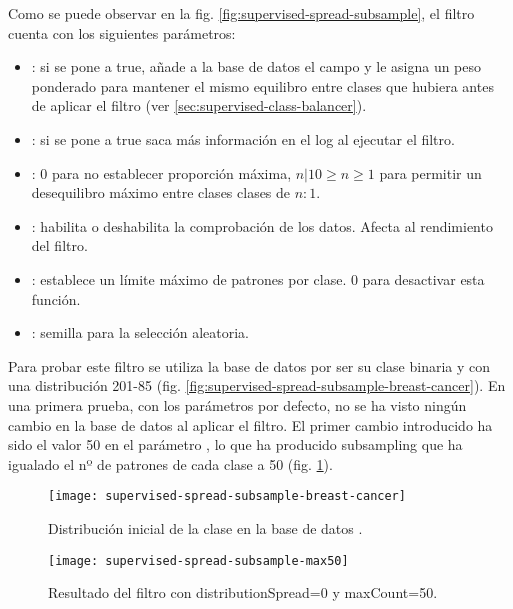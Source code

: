 Como se puede observar en la fig. \ref{fig:supervised-spread-subsample}, el filtro  cuenta con los siguientes parámetros:
\begin{itemize}
    \item {}: si se pone a true, añade a la base de datos el campo  y le asigna un peso ponderado para mantener el mismo equilibro entre clases que hubiera antes de aplicar el filtro (ver \ref{sec:supervised-class-balancer}).
    \item {}: si se pone a true saca más información en el log al ejecutar el filtro.
    \item {}: 0 para no establecer proporción máxima, $n | 10\geq n\geq 1$ para permitir un desequilibro máximo entre clases clases de $n:1$.
    \item {}: habilita o deshabilita la comprobación de los datos. Afecta al rendimiento del filtro.
    \item {}: establece un límite máximo de patrones por clase. 0 para desactivar esta función.
    \item {}: semilla para la selección aleatoria.
\end{itemize}

Para probar este filtro se utiliza la base de datos  por ser su clase binaria y con una distribución 201-85 (fig. \ref{fig:supervised-spread-subsample-breast-cancer}). En una primera prueba, con los parámetros por defecto, no se ha visto ningún cambio en la base de datos al aplicar el filtro. El primer cambio introducido ha sido el valor 50 en el parámetro , lo que ha producido subsampling que ha igualado el nº de patrones de cada clase a 50 (fig. \ref{fig:supervised-spread-subsample-max50}).


\begin{figure}[H]
    \centering
    \begin{minipage}{0.50\textwidth}
        \centering
        \texttt{[image: supervised-spread-subsample-breast-cancer]}
        \caption{Distribución inicial de la clase en la base de datos .}
        \label{fig:supervised-spread-subsample-breast-cancer}
    \end{minipage}\hfill
    \begin{minipage}{0.50\textwidth}
        \centering
        \texttt{[image: supervised-spread-subsample-max50]}
        \caption{Resultado del filtro con distributionSpread=0 y maxCount=50.}
        \label{fig:supervised-spread-subsample-max50}
    \end{minipage}
\end{figure}

